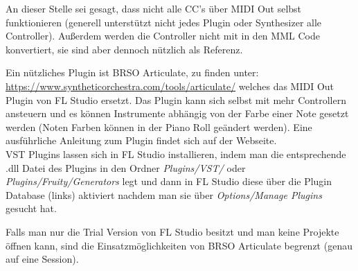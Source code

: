 \bigskip

An dieser Stelle sei gesagt, dass nicht alle CC's über MIDI Out selbst funktionieren (generell unterstützt nicht jedes Plugin oder Synthesizer alle Controller). Außerdem werden die Controller nicht mit in den MML Code konvertiert, sie sind aber dennoch nützlich als Referenz.

\bigskip

Ein nützliches Plugin ist BRSO Articulate, zu finden unter: \\ \href{https://www.syntheticorchestra.com/tools/articulate/}{https://www.syntheticorchestra.com/tools/articulate/} welches das MIDI Out Plugin von FL Studio ersetzt. Das Plugin kann sich selbst mit mehr Controllern ansteuern und es können Instrumente abhängig von der Farbe einer Note gesetzt werden (Noten Farben können in der Piano Roll geändert werden). Eine ausführliche Anleitung zum Plugin findet sich auf der Webseite. \\
VST Plugins lassen sich in FL Studio installieren, indem man die entsprechende .dll Datei des Plugins in den Ordner \textit{Plugins/VST/} oder \textit{Plugins/Fruity/Generators} legt und dann in FL Studio diese über die Plugin Database (links) aktiviert nachdem man sie über \textit{Options/Manage Plugins} gesucht hat.

\bigskip

Falls man nur die Trial Version von FL Studio besitzt und man keine Projekte öffnen kann, sind die Einsatzmöglichkeiten von BRSO Articulate begrenzt (genau auf eine Session).